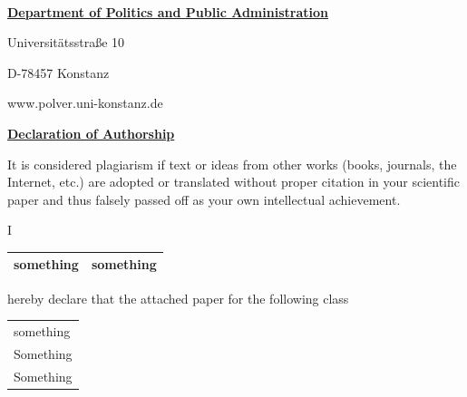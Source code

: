 \documentclass[a4paper,11pt,xcolor=dvipsnames]{article}
\begin{document}
\

{\raggedleft\small




\textbf{\ul{Department of Politics and Public Administration}}

\scriptsize
\vspace{0.4cm}

Universitätsstraße 10

D-78457 Konstanz

\vspace{0.2cm}

www.polver.uni-konstanz.de

}

\vspace{0.25cm}

{\large{\textbf{\ul{Declaration of Authorship}}}}

\raggedright
\vspace{0.5cm}

It is considered plagiarism if text or ideas from other works (books,
journals, the Internet, etc.) are adopted or translated without proper
citation in your scientific paper and thus falsely passed off as your
own intellectual achievement.

\vspace{0.25cm}

\begin{minipage}{0.05\textwidth}
    I
\end{minipage}\begin{minipage}{0.95\textwidth}
        \begin{tabularx}{\textwidth}{X|X|}
            \hline
        \cellcolor{black!15}something & \cellcolor{black!15}something\\
        \hline
        \end{tabularx}

\end{minipage}

\vspace{0.2cm}

hereby declare that the attached paper for the following class

\vspace{-0.25cm}

\begin{center}
\begin{tabularx}{0.975\textwidth}{|X|}
    \hline
    \cellcolor{black!15}something\\
    \cellcolor{black!15}Something\\
    \cellcolor{black!15}Something\\
    \hline
\end{tabularx}
\end{center}
\end{document}
